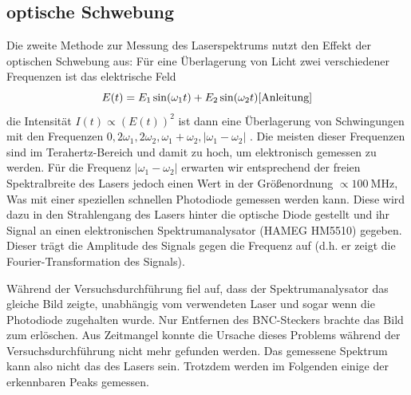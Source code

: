 \documentclass{article}
\begin{document}
\subsection{optische Schwebung}
Die zweite Methode zur Messung des Laserspektrums nutzt den Effekt der optischen Schwebung aus:
Für eine Überlagerung von Licht zwei verschiedener Frequenzen ist das elektrische Feld
\[
  E(t) = E_1 \sin(\omega_1 t) + E_2 \sin(\omega_2 t) \cite{Anleitung}
\]
die Intensität $I(t) \propto (E(t))^2$ ist dann eine Überlagerung von Schwingungen mit den Frequenzen
$0, 2\omega_1, 2\omega_2, \omega_1+\omega_2, \lvert \omega_1-\omega_2 \rvert$ \cite{Anleitung}.
Die meisten dieser Frequenzen sind im Terahertz-Bereich und damit zu hoch, um elektronisch gemessen zu werden.
Für die Frequenz $\lvert \omega_1-\omega_2 \rvert$ erwarten wir
entsprechend der freien Spektralbreite des Lasers jedoch einen Wert in der Größenordnung $\propto \SI{100}{\MHz}$,
Was mit einer speziellen schnellen Photodiode gemessen werden kann. Diese wird dazu in den Strahlengang des Lasers
hinter die optische Diode gestellt und ihr Signal an einen elektronischen Spektrumanalysator (HAMEG HM5510) gegeben.
Dieser trägt die Amplitude des Signals gegen die Frequenz auf (d.h. er zeigt die Fourier-Transformation des Signals).

Während der Versuchsdurchführung fiel auf, dass der Spektrumanalysator das gleiche Bild zeigte, unabhängig vom verwendeten Laser
und sogar wenn die Photodiode zugehalten wurde. Nur Entfernen des BNC-Steckers brachte das Bild zum erlöschen.
Aus Zeitmangel konnte die Ursache dieses Problems während der Versuchsdurchführung nicht mehr gefunden werden.
Das gemessene Spektrum kann also nicht das des Lasers sein. Trotzdem werden im Folgenden einige der erkennbaren Peaks gemessen.
\end{document}
